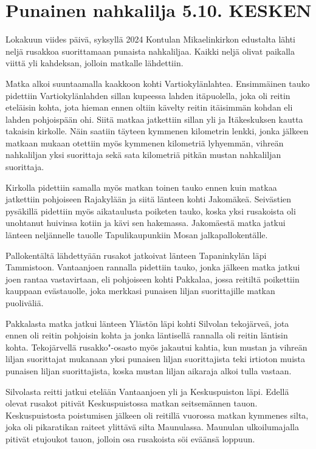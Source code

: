 \section{Punainen nahkalilja 5.10. KESKEN}

\begin{multicols}{2}
\noindent Lokakuun viides päivä, syksyllä 2024 Kontulan Mikaelinkirkon 
edustalta lähti neljä rusakkoa suorittamaan punaista nahkaliljaa. Kaikki 
neljä olivat paikalla viittä yli kahdeksan, jolloin matkalle lähdettiin. 

Matka alkoi suuntaamalla kaakkoon kohti Vartiokylänlahtea. Ensimmäinen tauko 
pidettiin Vartiokylänlahden sillan kupeessa lahden itäpuolella, joka oli 
reitin eteläisin kohta, jota hieman ennen oltiin kävelty reitin itäisimmän 
kohdan eli lahden pohjoispään ohi. Siitä matkaa jatkettiin sillan yli ja 
Itäkeskuksen kautta takaisin kirkolle. Näin saatiin täyteen kymmenen 
kilometrin lenkki, jonka jälkeen matkaan mukaan otettiin myös kymmenen 
kilometriä lyhyemmän, vihreän nahkaliljan yksi suorittaja sekä sata 
kilometriä pitkän mustan nahkaliljan suorittaja. 

Kirkolla pidettiin samalla myös matkan toinen tauko ennen kuin matkaa 
jatkettiin pohjoiseen Rajakylään ja siitä länteen kohti Jakomäkeä. 
Seivästien pysäkillä pidettiin myös aikataulusta poiketen tauko, koska yksi 
rusakoista oli unohtanut huivinsa kotiin ja kävi sen hakemassa. Jakomäestä 
matka jatkui länteen neljännelle tauolle Tapulikaupunkiin Mosan 
jalkapallokentälle.

Pallokentältä lähdettyään rusakot jatkoivat länteen Tapaninkylän läpi 
Tammistoon. Vantaanjoen rannalla pidettiin tauko, jonka jälkeen matka jatkui 
joen rantaa vastavirtaan, eli pohjoiseen kohti Pakkalaa, jossa reitiltä 
poikettiin kauppaan evästauolle, joka merkkasi punaisen liljan suorittajille 
matkan puoliväliä.

Pakkalasta matka jatkui länteen Ylästön läpi kohti Silvolan tekojärveä, 
jota ennen oli reitin pohjoisin kohta ja jonka läntisellä rannalla oli reitin 
läntisin kohta. Tekojärvellä rusakko"-osasto myös jakautui kahtia, kun 
mustan ja vihreän liljan suorittajat mukanaan yksi punaisen liljan 
suorittajista teki irtioton muista punaisen liljan suorittajista, koska mustan 
liljan aikaraja alkoi tulla vastaan. 

Silvolasta reitti jatkui etelään Vantaanjoen yli ja Keskuspuiston läpi. 
Edellä olevat rusakot pitivät Keskuspuistossa matkan seitsemännen tauon. 
Keskuspuistosta poistumisen jälkeen oli reitillä vuorossa matkan kymmenes 
silta, joka oli pikaratikan raiteet ylittävä silta Maunulassa. Maunulan 
ulkoilumajalla pitivät etujoukot tauon, jolloin osa rusakoista söi eväänsä 
loppuun.


\end{multicols}
